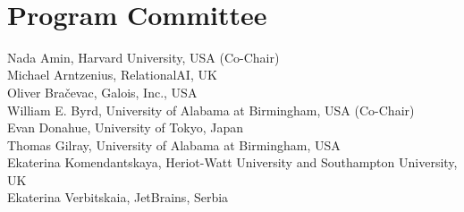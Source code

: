 \documentclass[a4paper]{book}
\begin{document}
\ \\

\section*{Program Committee}
\noindent
Nada Amin, Harvard University, USA (Co-Chair)\\
Michael Arntzenius, RelationalAI, UK\\
Oliver Bračevac, Galois, Inc., USA\\
William E. Byrd, University of Alabama at Birmingham, USA (Co-Chair)\\
Evan Donahue, University of Tokyo, Japan\\
Thomas Gilray, University of Alabama at Birmingham, USA\\
Ekaterina Komendantskaya, Heriot-Watt University and Southampton University, UK\\
Ekaterina Verbitskaia, JetBrains, Serbia\\

\tableofcontents
\mainmatter
{}



\ \\
\pagebreak



\ \\
\pagebreak



\ \\
\pagebreak



\ \\
\pagebreak
\end{document}
